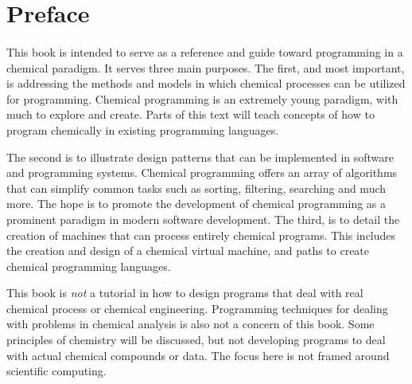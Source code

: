 
\section{Preface}
\paragraph{   } This book is intended to serve as a reference and guide toward programming in a chemical paradigm.  It serves three main purposes. The first, and most important, is addressing the methods and models in which chemical processes can be utilized for programming. Chemical programming is an extremely young paradigm, with much to explore and create. Parts of this text will teach concepts of how to program chemically in existing programming languages.
\par The second is to illustrate design patterns that can be implemented in software and programming systems. Chemical programming offers an array of algorithms that can simplify common tasks such as sorting, filtering, searching and much more. The hope is to promote the development of chemical programming as a prominent paradigm in modern software development.  The third, is to detail the creation of machines that can process entirely chemical programs. This includes the creation and design of a chemical virtual machine, and paths to create  chemical programming languages.
\par This book is \textit{not} a tutorial in how to design programs that deal with real chemical process or chemical engineering. Programming techniques for dealing with problems in chemical analysis is also not a concern of this book. Some principles of chemistry will be discussed, but not developing programs to deal with actual chemical compounds or data. The focus here is not framed around scientific computing.


